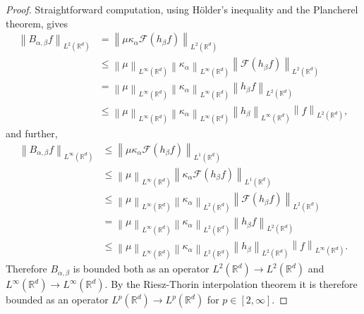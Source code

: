 \documentclass{article}
\theoremstyle{definition}
\newcommand{\R}{\mathbb{R}}
\newcommand{\norm}[1]{\left\lVert#1\right\rVert}
\newcommand{\fourier}{\mathcal{F}}
\begin{document}
\begin{proof}
Straightforward computation,
using
H\"older's inequality and
the Plancherel theorem,
gives
\begin{align*}
    \norm{B_{\alpha,\beta}f}_{L^2(\R^d)}
    &=
    \norm{\mu
    \kappa_\alpha
    \fourier\left({h_\beta} f\right)
    }_{L^2(\R^d)}\\
    &\leq
    \norm{
    \mu
    }_{L^\infty(\R^d)}
    \norm{
    \kappa_\alpha
    }_{L^\infty(\R^d)}
    \norm{
    \fourier\left({h_\beta} f\right)
    }_{L^2(\R^d)}\\
    &=
    \norm{
    \mu
    }_{L^\infty(\R^d)}
    \norm{
    \kappa_\alpha
    }_{L^\infty(\R^d)}
    \norm{
    {h_\beta} f
    }_{L^2(\R^d)}\\
    &\leq
    \norm{
    \mu
    }_{L^\infty(\R^d)}
    \norm{
    \kappa_\alpha
    }_{L^\infty(\R^d)}
    \norm{
    {h_\beta}
    }_{L^\infty(\R^d)}
    \norm{
    f
    }_{L^2(\R^d)},
\end{align*}
and further,
\begin{align*}
    \norm{B_{\alpha,\beta}f}_{L^\infty(\R^d)}
    &\leq
    \norm{\mu
    \kappa_\alpha
    \fourier\left({h_\beta} f\right)
    }_{L^1(\R^d)}\\
    &\leq
    \norm{
    \mu
    }_{L^\infty(\R^d)}
    \norm{
    \kappa_\alpha
    \fourier\left({h_\beta} f\right)
    }_{L^1(\R^d)}\\
    &\leq
    \norm{
    \mu
    }_{L^\infty(\R^d)}
    \norm{
    \kappa_\alpha
    }_{L^2(\R^d)}
    \norm{
    \fourier\left({h_\beta} f\right)
    }_{L^2(\R^d)}\\
    &=
    \norm{
    \mu
    }_{L^\infty(\R^d)}
    \norm{
    \kappa_\alpha
    }_{L^2(\R^d)}
    \norm{
    {h_\beta} f
    }_{L^2(\R^d)}\\
    &\leq
    \norm{
    \mu
    }_{L^\infty(\R^d)}
    \norm{
    \kappa_\alpha
    }_{L^2(\R^d)}
    \norm{
    {h_\beta}
    }_{L^2(\R^d)}
    \norm{
    f
    }_{L^\infty(\R^d)}.
\end{align*}
Therefore \(B_{\alpha,\beta}\) is bounded 
both as an
operator \(L^2(\R^d)\to L^2(\R^d)\)
and
\(L^\infty(\R^d)\to L^\infty(\R^d)\).
By the Riesz-Thorin interpolation theorem
it is therefore bounded as an operator \(L^p(\R^d)\to L^p(\R^d)\) for \(p\in[2,\infty]\).
\end{proof}
\end{document}
